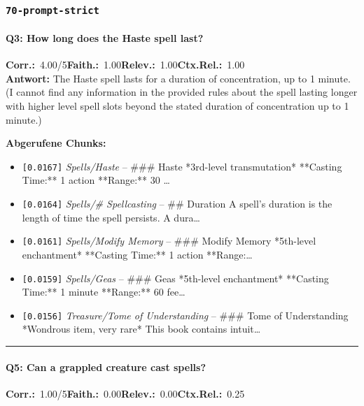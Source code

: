 \subsubsection*{\texttt{70-prompt-strict}}
\label{app:samples:70_prompt_strict}

\paragraph{Q3: How long does the Haste spell last?}
\noindent \textbf{Corr.:}~4.00/5\quad \textbf{Faith.:}~1.00\quad \textbf{Relev.:}~1.00\quad \textbf{Ctx.Rel.:}~1.00\\

\noindent\textbf{Antwort:} The Haste spell lasts for a duration of concentration, up to 1 minute. (I cannot find any information in the provided rules about the spell lasting longer with higher level spell slots beyond the stated duration of concentration up to 1 minute.)

\noindent\textbf{Abgerufene Chunks:}
\begin{itemize}[noitemsep, topsep=2pt]
  \item[\textbf{\#1}] \texttt{[0.0167]} \textit{Spells/Haste} -- \#\#\# Haste  *3rd-level transmutation*  **Casting Time:** 1 action  **Range:** 30 \ldots
  \item[\textbf{\#2}] \texttt{[0.0164]} \textit{Spells/# Spellcasting} -- \#\# Duration  A spell's duration is the length of time the spell persists. A dura\ldots
  \item[\textbf{\#3}] \texttt{[0.0161]} \textit{Spells/Modify Memory} -- \#\#\# Modify Memory  *5th-level enchantment*  **Casting Time:** 1 action  **Range:\ldots
  \item[\textbf{\#4}] \texttt{[0.0159]} \textit{Spells/Geas} -- \#\#\# Geas  *5th-level enchantment*  **Casting Time:** 1 minute  **Range:** 60 fee\ldots
  \item[\textbf{\#5}] \texttt{[0.0156]} \textit{Treasure/Tome of Understanding} -- \#\#\# Tome of Understanding  *Wondrous item, very rare*  This book contains intuit\ldots
\end{itemize}
\vspace{4pt}
\hrule
\vspace{6pt}

\paragraph{Q5: Can a grappled creature cast spells?}
\noindent \textbf{Corr.:}~1.00/5\quad \textbf{Faith.:}~0.00\quad \textbf{Relev.:}~0.00\quad \textbf{Ctx.Rel.:}~0.25\\

